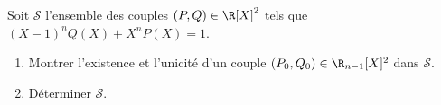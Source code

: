 \begin{enonce}
\begin{exercise}[ID={RMS134 E1384},subtitle={IMT MP
    2023},theme={algebre},concours={mines-telecom},annee={2023}, difficulty={0}]
  Soit $\mathcal{S}$ l'ensemble des couples $(P,Q)\in\R[X]^2$ tels que $(X-1)^nQ(X)+X^nP(X)=1$.
  \begin{enumerate}
  \item Montrer l'existence et l'unicité d'un couple
    $(P_0,Q_0)\in\R_{n-1}[X]^2$ dans $\mathcal{S}$.
  \item Déterminer $\mathcal{S}$.
  \end{enumerate}
\end{exercise}
\end{enonce}
